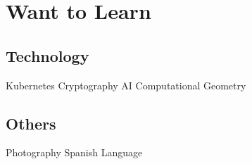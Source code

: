 \documentclass[]{deedy-resume-openfont}
\begin{document}
\begin{minipage}[t]{0.33\textwidth}
\section{Want to Learn}
\subsection{Technology}
Kubernetes  \textbullet{} Cryptography  \textbullet{} AI
 \textbullet{} Computational Geometry
\sectionsep
\subsection{Others}
Photography  \textbullet{} Spanish Language


%
%

\end{minipage}
\hfill
\end{document}
